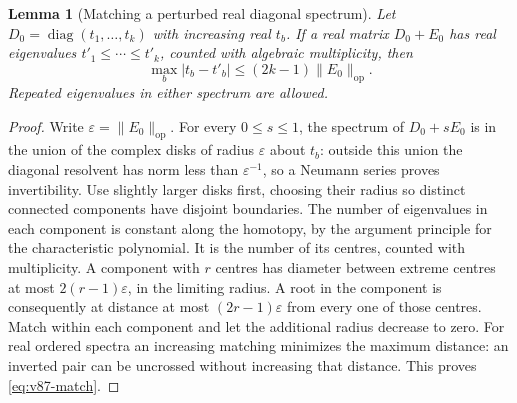 \documentclass[11pt,reqno]{amsart}
\numberwithin{equation}{section}
\newtheorem{lemma}[theorem]{Lemma}
\theoremstyle{definition}\newtheorem{definition}[theorem]{Definition}
\theoremstyle{remark}\newtheorem{remark}[theorem]{Remark}
\newcommand{\diag}{\operatorname{diag}}
\newcommand{\op}{\mathrm{op}}
\begin{document}
\begin{lemma}[Matching a perturbed real diagonal spectrum]
\label{lem:v87-match}
Let $D_0=\diag(t_1,\ldots,t_k)$ with increasing real $t_b$.
If a real matrix $D_0+E_0$ has real eigenvalues
$t'_1\le\cdots\le t'_k$, counted with algebraic multiplicity, then
\begin{equation}\label{eq:v87-match}
             \max_b|t_b-t'_b|\le(2k-1)\|E_0\|_\op.
\end{equation}
Repeated eigenvalues in either spectrum are allowed.
\end{lemma}
\begin{proof}
Write $\varepsilon=\|E_0\|_\op$. For every $0\le s\le1$, the
spectrum of $D_0+sE_0$ is in the union of the complex disks of radius
$\varepsilon$ about $t_b$: outside this union the diagonal resolvent
has norm less than $\varepsilon^{-1}$, so a Neumann series proves
invertibility. Use slightly larger disks first, choosing their radius
so distinct connected components have disjoint boundaries. The number
of eigenvalues in each component is constant along the homotopy,
by the argument principle for the characteristic polynomial. It is
the number of its centres, counted with multiplicity. A component
with $r$ centres has diameter between extreme centres at most
$2(r-1)\varepsilon$, in the limiting radius. A root in the component
is consequently at distance at most $(2r-1)\varepsilon$ from every
one of those centres. Match within each component and let the
additional radius decrease to zero. For real ordered spectra an
increasing matching minimizes the maximum distance: an inverted pair
can be uncrossed without increasing that distance. This proves
\eqref{eq:v87-match}.
\end{proof}
\end{document}
